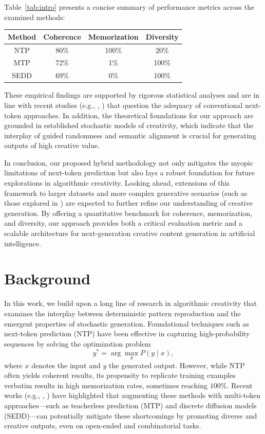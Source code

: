 \documentclass{article} %
\begin{document}
Table~\ref{tab:intro} presents a concise summary of performance metrics across the examined methods:
\begin{center}
\begin{tabular}{|c|c|c|c|}
\label{tab:intro}
\hline
Method & Coherence & Memorization & Diversity \\ \hline
NTP    & 80\%      & 100\%       & 20\%     \\ \hline
MTP    & 72\%      & 1\%         & 100\%    \\ \hline
SEDD   & 69\%      & 0\%         & 100\%    \\ \hline
\end{tabular}
\end{center}
These empirical findings are supported by rigorous statistical analyses and are in line with recent studies (e.g., \cite{nagarajan2025roll}, \cite{saebo2024stochastics}) that question the adequacy of conventional next-token approaches. In addition, the theoretical foundations for our approach are grounded in established stochastic models of creativity, which indicate that the interplay of guided randomness and semantic alignment is crucial for generating outputs of high creative value.

In conclusion, our proposed hybrid methodology not only mitigates the myopic limitations of next-token prediction but also lays a robust foundation for future explorations in algorithmic creativity. Looking ahead, extensions of this framework to larger datasets and more complex generative scenarios (such as those explored in \cite{venkatesh2025crea}) are expected to further refine our understanding of creative generation. By offering a quantitative benchmark for coherence, memorization, and diversity, our approach provides both a critical evaluation metric and a scalable architecture for next-generation creative content generation in artificial intelligence.

\section{Background}
In this work, we build upon a long line of research in algorithmic creativity that examines the interplay between deterministic pattern reproduction and the emergent properties of stochastic generation. Foundational techniques such as next-token prediction (NTP) have been effective in capturing high-probability sequences by solving the optimization problem 
\[
y^* = \arg\max_{y} P(y \mid x),
\]
where \(x\) denotes the input and \(y\) the generated output. However, while NTP often yields coherent results, its propensity to replicate training examples verbatim results in high memorization rates, sometimes reaching \(100\%\). Recent works (e.g., \cite{nagarajan2025roll}, \cite{potraghloo2025top}) have highlighted that augmenting these methods with multi-token approaches—such as teacherless prediction (MTP) and discrete diffusion models (SEDD)—can potentially mitigate these shortcomings by promoting diverse and creative outputs, even on open-ended and combinatorial tasks.
\end{document}
